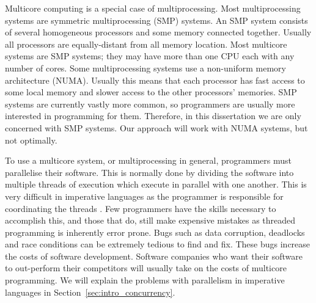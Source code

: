 
Multicore computing is a special case of multiprocessing.
Most multiprocessing systems are symmetric multiprocessing (SMP) systems.
An SMP system consists of several homogeneous processors and some memory
connected together.
Usually all processors are equally-distant from all memory location.
Most multicore systems are SMP systems;
they may have more than one CPU each with any number of cores.
Some multiprocessing systems use a non-uniform memory architecture (NUMA).
Usually this means that each processor has fast access to some local memory
and slower access to the other processors' memories.
SMP systems are currently vastly more common, so programmers are usually
more interested in programming for them.
Therefore, in this dissertation we are only concerned with SMP systems.
Our approach will work with NUMA systems, but not optimally.


To use a multicore system, or multiprocessing in general,
programmers must parallelise their software.
This is normally done by dividing the software into multiple threads of
execution
which execute in parallel with one another.
This is very difficult in imperative languages as the programmer is
responsible for coordinating the threads \citep{sutter:2005:concurrency}.
Few programmers have the skills necessary to accomplish this,
and those that do, still make expensive mistakes as
threaded programming is inherently error prone. 
Bugs such as data corruption, deadlocks and race conditions
can be extremely tedious to find and fix.
These bugs increase the costs of software development.
Software companies who want their software to out-perform their competitors
will usually take on the costs of multicore programming.
We will explain the problems with parallelism in imperative languages in
Section~\ref{sec:intro_concurrency}.


